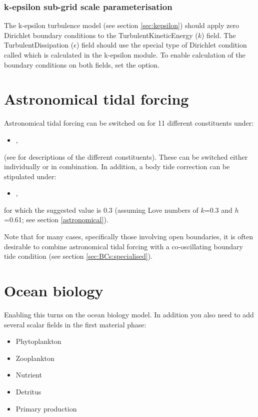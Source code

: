 \subsubsection{k-epsilon sub-grid scale parameterisation} \label{sec:BCs:special:kepsilon}

The k-epsilon turbulence model (see section \ref{sec:kepsilon}) should apply zero
Dirichlet boundary conditions to the TurbulentKineticEnergy ($k$) field. The
TurbulentDissipation ($\epsilon$) field should use the special type of Dirichlet condition
called  which is calculated in the k-epsilon module. To enable
calculation of the boundary conditions on both fields, set the \linebreak
{} option.

\section{Astronomical tidal forcing}
\label{config:tides}

Astronomical tidal forcing can be switched on for 11 different constituents
under:
\begin{itemize}
\item {}, 
\end{itemize}
(see \citealp{Wells2008} for descriptions of
the different constituents). These can be switched either
individually or in combination. In addition, a body tide correction can be stipulated
under:
\begin{itemize}
\item {},
\end{itemize}
for which the suggested value is 0.3 (assuming 
Love numbers of $k$=0.3 and $h$=0.61; see section \ref{astronomical}).   

Note that for many cases, specifically those involving open boundaries, it is often
desirable to combine astronomical tidal forcing with a co-oscillating boundary tide condition
(see section \ref{sec:BCs:specialised}).

\section{Ocean biology}

Enabling this turns on the ocean biology model. In addition you also need to add several scalar fields in the first material phase:
\begin{itemize}
\item Phytoplankton
\item Zooplankton
\item Nutrient
\item Detritus
\item Primary production
\end{itemize}

